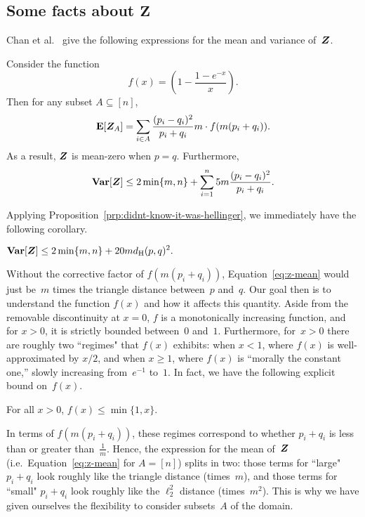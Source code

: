 \subsection{Some facts about $\mathbf Z$}
\label{sec:eq-prelim}
Chan et al.~\cite{ChanDVV14} give the following expressions for the mean and variance of~$\boldsymbol{Z}$.

\begin{proposition}\label{prop:mean-var}
Consider the function
\begin{equation*}
f(x) = \left(1 - \frac{1- e^{-x}}{x}\right).
\end{equation*}
Then for any subset $A\subseteq [n]$,
\begin{equation}\label{eq:z-mean}
\mbox{\bf E}[\boldsymbol{Z}_A] = \sum_{i \in A} \frac{(p_i-q_i)^2}{p_i+q_i} m \cdot f(m(p_i + q_i)).
\end{equation}
As a result, $\boldsymbol{Z}$ is mean-zero when $p= q$.  Furthermore,
\begin{equation*}
\mbox{\bf Var}[\boldsymbol{Z}] \leq 2 \min\{m, n\} + \sum_{i=1}^n 5m \frac{(p_i - q_i)^2}{p_i + q_i}.
\end{equation*}
\end{proposition}
\noindent
Applying Proposition~\ref{prp:didnt-know-it-was-hellinger}, we immediately have the following corollary.
\begin{corollary}\label{cor:var-hel}
$\displaystyle
\mbox{\bf Var}[\boldsymbol{Z}] \leq 2 \min\{m, n\} +  20m d_{\mathrm {H}}(p,q)^2.
$
\end{corollary}

Without the corrective factor of $f(m(p_i + q_i))$,
Equation~\eqref{eq:z-mean} would just be~$m$ times the triangle distance between~$p$ and~$q$.
Our goal then is to understand the function $f(x)$ and how it affects this quantity.
Aside from the removable discontinuity at $x=0$, $f$ is a monotonically increasing function,
and for $x > 0$, it is strictly bounded between~$0$ and~$1$.
Furthermore, for~$x > 0$ there are roughly two ``regimes" that $f(x)$ exhibits:
when $x < 1$, where $f(x)$ is well-approximated by $x/2$,
and when $x \geq 1$, where $f(x)$ is ``morally the constant one,'' slowly increasing from~$e^{-1}$ to~$1$.
In fact, we have the following explicit bound on~$f(x)$.
\begin{fact}\label{fact:f-upper}
For all $x > 0$, $f(x) \leq \min\{1, x\}.$
\end{fact}
\noindent
In terms of $f(m(p_i + q_i))$, these regimes correspond to whether $p_i + q_i$ is less than or greater than~$\frac{1}{m}$.
Hence, the expression for the mean of~$\boldsymbol{Z}$ (i.e.\ Equation~\eqref{eq:z-mean} for $A = [n]$)
splits in two: those terms for ``large" $p_i + q_i$ look roughly like the triangle distance (times~$m$),
and those terms for ``small" $p_i + q_i$ look roughly like the $\ell_2^2$ distance (times~$m^2$).
This is why we have given ourselves the flexibility to consider subsets~$A$ of the domain.

